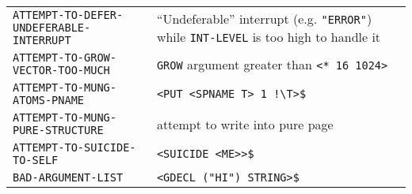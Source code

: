 \documentclass[a4paper,]{article}
\begin{document}
\begin{longtable}[]{@{}ll@{}}
\begin{minipage}[t]{0.58\columnwidth}\raggedright\strut
\texttt{ATTEMPT-TO-DEFER-UNDEFERABLE-INTERRUPT}\strut
\end{minipage} & \begin{minipage}[t]{0.36\columnwidth}\raggedright\strut
``Undeferable'' interrupt (e.g. \texttt{"ERROR"}) while \texttt{INT-LEVEL} is too high to handle it\strut
\end{minipage}\tabularnewline
\begin{minipage}[t]{0.58\columnwidth}\raggedright\strut
\texttt{ATTEMPT-TO-GROW-VECTOR-TOO-MUCH}\strut
\end{minipage} & \begin{minipage}[t]{0.36\columnwidth}\raggedright\strut
\texttt{GROW} argument greater than \texttt{\textless{}*\ 16\ 1024\textgreater{}}\strut
\end{minipage}\tabularnewline
\begin{minipage}[t]{0.58\columnwidth}\raggedright\strut
\texttt{ATTEMPT-TO-MUNG-ATOMS-PNAME}\strut
\end{minipage} & \begin{minipage}[t]{0.36\columnwidth}\raggedright\strut
\texttt{\textless{}PUT\ \textless{}SPNAME\ T\textgreater{}\ 1\ !\textbackslash{}T\textgreater{}\$}\strut
\end{minipage}\tabularnewline
\begin{minipage}[t]{0.58\columnwidth}\raggedright\strut
\texttt{ATTEMPT-TO-MUNG-PURE-STRUCTURE}\strut
\end{minipage} & \begin{minipage}[t]{0.36\columnwidth}\raggedright\strut
attempt to write into pure page\strut
\end{minipage}\tabularnewline
\begin{minipage}[t]{0.58\columnwidth}\raggedright\strut
\texttt{ATTEMPT-TO-SUICIDE-TO-SELF}\strut
\end{minipage} & \begin{minipage}[t]{0.36\columnwidth}\raggedright\strut
\texttt{\textless{}SUICIDE\ \textless{}ME\textgreater{}\textgreater{}\$}\strut
\end{minipage}\tabularnewline
\begin{minipage}[t]{0.58\columnwidth}\raggedright\strut
\texttt{BAD-ARGUMENT-LIST}\strut
\end{minipage} & \begin{minipage}[t]{0.36\columnwidth}\raggedright\strut
\texttt{\textless{}GDECL\ ("HI")\ STRING\textgreater{}\$}\strut
\end{minipage}\tabularnewline

\end{longtable}
\end{document}
